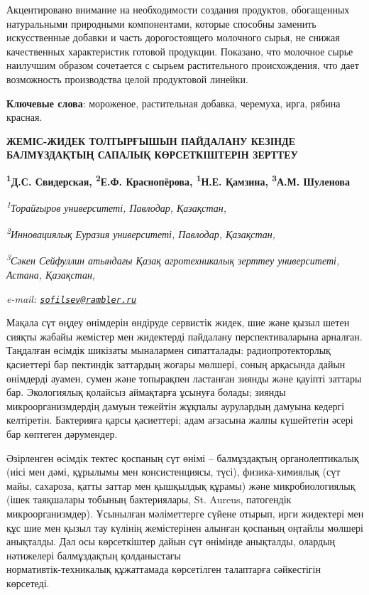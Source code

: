 Акцентировано внимание на необходимости создания продуктов, обогащенных
натуральными природными компонентами, которые способны заменить
искусственные добавки и часть дорогостоящего молочного сырья, не снижая
качественных характеристик готовой продукции. Показано, что молочное
сырье наилучшим образом сочетается с сырьем растительного происхождения,
что дает возможность производства целой продуктовой линейки.

{\bfseries Ключевые слова}: мороженое, растительная добавка, черемуха,
ирга, рябина красная.

\begin{articleheader}
{\bfseries ЖЕМІС-ЖИДЕК ТОЛТЫРҒЫШЫН ПАЙДАЛАНУ КЕЗІНДЕ БАЛМҰЗДАҚТЫҢ САПАЛЫҚ КӨРСЕТКІШТЕРІН ЗЕРТТЕУ}

{\bfseries
\textsuperscript{1}Д.С. Свидерская\textsuperscript{\envelope },
\textsuperscript{2}Е.Ф. Краснопёрова,
\textsuperscript{1}Н.Е. Қамзина,
\textsuperscript{3}А.М. Шуленова}
\end{articleheader}

\begin{affiliation}
\emph{\textsuperscript{1}Торайғыров университеті, Павлодар, Қазақстан,}

\emph{\textsuperscript{2}Инновациялық Еуразия университеті, Павлодар, Қазақстан,}

\emph{\textsuperscript{3}Сәкен Сейфуллин атындағы Қазақ агротехникалық зерттеу университеті, Астана, Қазақстан,}

\emph{e-mail: \href{mailto:sofilsev@rambler.ru}{\nolinkurl{sofilsev@rambler.ru}}}
\end{affiliation}

Мақала сүт өңдеу өнімдерін өндіруде сервистік жидек, шие және қызыл
шетен сияқты жабайы жемістер мен жидектерді пайдалану перспективаларына
арналған. Таңдалған өсімдік шикізаты мыналармен сипатталады:
радиопротекторлық қасиеттері бар пектиндік заттардың жоғары мөлшері,
соның арқасында дайын өнімдерді ауамен, сумен және топырақпен ластанған
зиянды және қауіпті заттары бар. Экологиялық қолайсыз аймақтарға ұсынуға
болады; зиянды микроорганизмдердің дамуын тежейтін жұқпалы аурулардың
дамуына кедергі келтіретін. Бактерияға қарсы қасиеттері; адам ағзасына
жалпы күшейтетін әсері бар көптеген дәрумендер.

Әзірленген өсімдік тектес қоспаның сүт өнімі -- балмұздақтың
органолептикалық (иісі мен дәмі, құрылымы мен консистенциясы, түсі),
физика-химиялық (сүт майы, сахароза, қатты заттар мен қышқылдық құрамы)
және микробиологиялық (ішек таяқшалары тобының бактериялары, St. Aureus,
патогендік микроорганизмдер). Ұсынылған мәліметтерге сүйене отырып, ирги
жидектері мен құс шие мен қызыл тау күлінің жемістерінен алынған
қоспаның оңтайлы мөлшері анықталды. Дәл осы көрсеткіштер дайын сүт
өнімінде анықталды, олардың нәтижелері балмұздақтың қолданыстағы\\
нормативтік-техникалық құжаттамада көрсетілген талаптарға сәйкестігін
көрсетеді.

